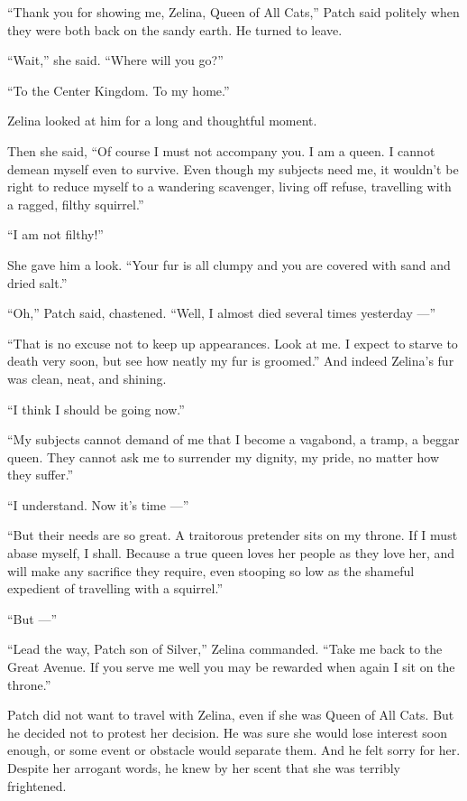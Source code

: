 \documentclass[ebook,oneside,openany,17pt]{memoir}
\newenvironment{tolerant}[1]{%
  \par\tolerance=#1\relax
}{%
  \par
}
\begin{document}
“Thank you for showing me, Zelina, Queen of All Cats,” Patch said
politely when they were both back on the sandy earth. He turned to
leave.

“Wait,” she said. “Where will you go?”

“To the Center Kingdom. To my home.”

Zelina looked at him for a long and thoughtful moment.

\begin{tolerant}{500}
Then she said, “Of course I must not accompany you. I am a queen. I
cannot demean myself even to survive. Even though my subjects need me,
it wouldn’t be right to reduce myself to a wandering scavenger, living
off refuse, travelling with a ragged, filthy squirrel.”
\end{tolerant}

“I am not filthy!”

She gave him a look. “Your fur is all clumpy and you are covered with
sand and dried salt.”

“Oh,” Patch said, chastened. “Well, I almost died several times
yesterday —”

“That is no excuse not to keep up appearances. Look at me. I expect to
starve to death very soon, but see how neatly my fur is groomed.”  And
indeed Zelina’s fur was clean, neat, and shining.

“I think I should be going now.”

“My subjects cannot demand of me that I become a vagabond, a tramp, a
beggar queen. They cannot ask me to surrender my dignity, my pride, no
matter how they suffer.”

“I understand. Now it’s time —”

“But their needs are so great. A traitorous pretender sits on my
throne. If I must abase myself, I shall. Because a true queen loves
her people as they love her, and will make any sacrifice they require,
even stooping so low as the shameful expedient of travelling with a
squirrel.”

“But —”

“Lead the way, Patch son of Silver,” Zelina commanded. “Take me back
to the Great Avenue. If you serve me well you may be rewarded when
again I sit on the throne.”

Patch did not want to travel with Zelina, even if she was Queen of All
Cats. But he decided not to protest her decision. He was sure she
would lose interest soon enough, or some event or obstacle would
separate them. And he felt sorry for her. Despite her arrogant words,
he knew by her scent that she was terribly frightened.
\end{document}
